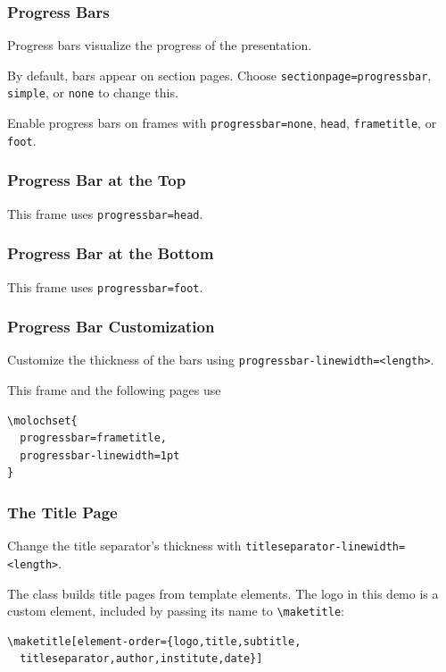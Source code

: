 \documentclass[10pt,aspect-ratio=4:3]{ltx-talk}
\begin{document}
\begin{frame}
  \frametitle{Progress Bars}
  Progress bars visualize the progress of the presentation. \medskip

  By default, bars appear on section pages. Choose
  \texttt{sectionpage=progressbar}, \texttt{simple}, or \texttt{none} to change
  this. \medskip

  Enable progress bars on frames with
  \texttt{progressbar=none}, \texttt{head}, \texttt{frametitle}, or \texttt{foot}.
\end{frame}

\begin{frame}
  \frametitle{Progress Bar at the Top}
  This frame uses \texttt{progressbar=head}.
\end{frame}

\begin{frame}
  \frametitle{Progress Bar at the Bottom}
  This frame uses \texttt{progressbar=foot}.
\end{frame}

\begin{frame*}
  \frametitle{Progress Bar Customization}
  Customize the thickness of the bars using
  \texttt{progressbar-linewidth=<length>}. \medskip

  This frame and the following pages use
  \begin{verbatim}
\molochset{
  progressbar=frametitle,
  progressbar-linewidth=1pt
}
  \end{verbatim}
\end{frame*}

\begin{frame*}
  \frametitle{The Title Page}
  Change the title separator's thickness with
  \texttt{titleseparator-linewidth=<length>}. \medskip

  The class builds title pages from template elements. The logo in this demo is
  a custom element, included by passing its name to \verb|\maketitle|:
  \begin{verbatim}
\maketitle[element-order={logo,title,subtitle,
  titleseparator,author,institute,date}]
  \end{verbatim}
\end{frame*}
\end{document}
